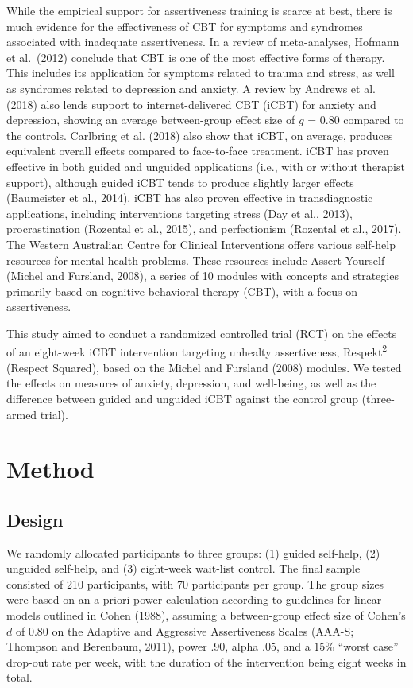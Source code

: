 \documentclass[3p]{elsarticle} %
\begin{document}
While the empirical support for assertiveness training is scarce at
best, there is much evidence for the effectiveness of CBT for symptoms
and syndromes associated with inadequate assertiveness. In a review of
meta-analyses, Hofmann et al.~(2012) conclude that CBT is one of the
most effective forms of therapy. This includes its application for
symptoms related to trauma and stress, as well as syndromes related to
depression and anxiety. A review by Andrews et al. (2018) also lends
support to internet-delivered CBT (iCBT) for anxiety and depression,
showing an average between-group effect size of \(g\) = \(0.80\)
compared to the controls. Carlbring et al. (2018) also show that iCBT,
on average, produces equivalent overall effects compared to face-to-face
treatment. iCBT has proven effective in both guided and unguided
applications (i.e., with or without therapist support), although guided
iCBT tends to produce slightly larger effects (Baumeister et al., 2014).
iCBT has also proven effective in transdiagnostic applications,
including interventions targeting stress (Day et al., 2013),
procrastination (Rozental et al., 2015), and perfectionism (Rozental et
al., 2017). The Western Australian Centre for Clinical Interventions
offers various self-help resources for mental health problems. These
resources include Assert Yourself (Michel and Fursland, 2008), a series
of 10 modules with concepts and strategies primarily based on cognitive
behavioral therapy (CBT), with a focus on assertiveness.

This study aimed to conduct a randomized controlled trial (RCT) on the
effects of an eight-week iCBT intervention targeting unhealty
assertiveness, Respekt\textsuperscript{2} (Respect Squared), based on
the Michel and Fursland (2008) modules. We tested the effects on
measures of anxiety, depression, and well-being, as well as the
difference between guided and unguided iCBT against the control group
(three-armed trial).

\hypertarget{method}{%
\section{Method}\label{method}}

\hypertarget{design}{%
\subsection{Design}\label{design}}

We randomly allocated participants to three groups: (1) guided
self-help, (2) unguided self-help, and (3) eight-week wait-list control.
The final sample consisted of 210 participants, with 70 participants per
group. The group sizes were based on an a priori power calculation
according to guidelines for linear models outlined in Cohen (1988),
assuming a between-group effect size of Cohen's \(d\) of \(0.80\) on the
Adaptive and Aggressive Assertiveness Scales (AAA-S; Thompson and
Berenbaum, 2011), power \(.90\), alpha \(.05\), and a \(15\)\% ``worst
case'' drop-out rate per week, with the duration of the intervention
being eight weeks in total.
\end{document}
